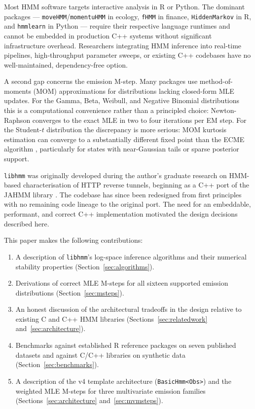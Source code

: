 \documentclass[11pt]{article}
\begin{document}
Most HMM software targets interactive analysis in R or Python.
The dominant packages --- \texttt{moveHMM}/\texttt{momentuHMM}
\citep{Michelot2016, McClintock2018} in ecology,
\texttt{fHMM} \citep{Oelschlager2024} in finance,
\texttt{HiddenMarkov} \citep{Harte2025} in R, and
\texttt{hmmlearn} in Python --- require their respective language runtimes
and cannot be embedded in production C++ systems without significant
infrastructure overhead.
Researchers integrating HMM inference into real-time pipelines, high-throughput
parameter sweeps, or existing C++ codebases have no well-maintained,
dependency-free option.

A second gap concerns the emission M-step.
Many packages use method-of-moments (MOM) approximations for distributions
lacking closed-form MLE updates.
For the Gamma, Beta, Weibull, and Negative Binomial distributions this is
a computational convenience rather than a principled choice: Newton-Raphson
converges to the exact MLE in two to four iterations per EM step.
For the Student-$t$ distribution the discrepancy is more serious: MOM
kurtosis estimation can converge to a substantially different fixed point
than the ECME algorithm \citep{Liu1994}, particularly for states with
near-Gaussian tails or sparse posterior support.

\texttt{libhmm} was originally developed during the author's graduate
research on HMM-based characterisation of HTTP reverse tunnels, beginning
as a C++ port of the JAHMM library \citep{JAHMM}.
The codebase has since been redesigned from first principles with no
remaining code lineage to the original port.
The need for an embeddable, performant, and correct C++ implementation
motivated the design decisions described here.

This paper makes the following contributions:
\begin{enumerate}
  \item A description of \texttt{libhmm}'s log-space inference algorithms
        and their numerical stability properties (Section~\ref{sec:algorithms}).
  \item Derivations of correct MLE M-steps for all sixteen supported
        emission distributions (Section~\ref{sec:msteps}).
  \item An honest discussion of the architectural tradeoffs in the design
        relative to existing C and C++ HMM libraries
        (Sections~\ref{sec:relatedwork} and~\ref{sec:architecture}).
  \item Benchmarks against established R reference packages on seven published
        datasets and against C/C++ libraries on synthetic data
        (Section~\ref{sec:benchmarks}).
  \item A description of the v4 template architecture (\texttt{BasicHmm<Obs>})
        and the weighted MLE M-steps for three multivariate emission families
        (Sections~\ref{sec:architecture} and~\ref{sec:mvmsteps}).
\end{enumerate}
\end{document}
